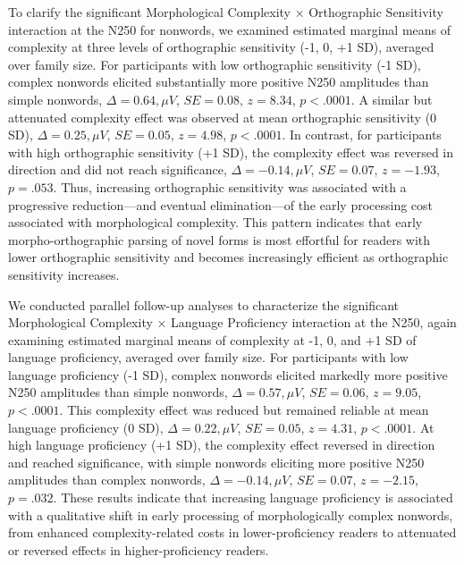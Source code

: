 \documentclass[preprint,12pt, authoryear, review]{elsarticle}
\begin{document}
	To clarify the significant Morphological Complexity × Orthographic Sensitivity interaction at the N250 for nonwords, we examined estimated marginal means of complexity at three levels of orthographic sensitivity (-1, 0, +1 SD), averaged over family size. For participants with low orthographic sensitivity (-1 SD), complex nonwords elicited substantially more positive N250 amplitudes than simple nonwords, $\Delta = 0.64,\mu V$, $SE = 0.08$, $z = 8.34$, $p < .0001$. A similar but attenuated complexity effect was observed at mean orthographic sensitivity (0 SD), $\Delta = 0.25,\mu V$, $SE = 0.05$, $z = 4.98$, $p < .0001$. In contrast, for participants with high orthographic sensitivity (+1 SD), the complexity effect was reversed in direction and did not reach significance, $\Delta = -0.14,\mu V$, $SE = 0.07$, $z = -1.93$, $p = .053$. Thus, increasing orthographic sensitivity was associated with a progressive reduction—and eventual elimination—of the early processing cost associated with morphological complexity. This pattern indicates that early morpho-orthographic parsing of novel forms is most effortful for readers with lower orthographic sensitivity and becomes increasingly efficient as orthographic sensitivity increases.
			
	We conducted parallel follow-up analyses to characterize the significant Morphological Complexity × Language Proficiency interaction at the N250, again examining estimated marginal means of complexity at -1, 0, and +1 SD of language proficiency, averaged over family size. For participants with low language proficiency (-1 SD), complex nonwords elicited markedly more positive N250 amplitudes than simple nonwords, $\Delta = 0.57,\mu V$, $SE = 0.06$, $z = 9.05$, $p < .0001$. This complexity effect was reduced but remained reliable at mean language proficiency (0 SD), $\Delta = 0.22,\mu V$, $SE = 0.05$, $z = 4.31$, $p < .0001$. At high language proficiency (+1 SD), the complexity effect reversed in direction and reached significance, with simple nonwords eliciting more positive N250 amplitudes than complex nonwords, $\Delta = -0.14,\mu V$, $SE = 0.07$, $z = -2.15$, $p = .032$. These results indicate that increasing language proficiency is associated with a qualitative shift in early processing of morphologically complex nonwords, from enhanced complexity-related costs in lower-proficiency readers to attenuated or reversed effects in higher-proficiency readers.
			
\end{document}
